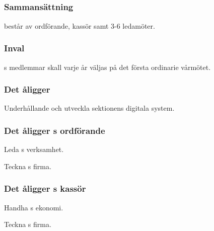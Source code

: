 \subsection{\DIGITFULL}
\subsubsection{Sammansättning}
\DIGIT{} består av ordförande, kassör samt 3-6 ledamöter.

\subsubsection{Inval}
\DIGIT{}s medlemmar skall varje år väljas på det första ordinarie vårmötet.

\subsubsection{Det åligger \DIGIT}
\begin{att}
	\item Underhållande och utveckla sektionens digitala system.
\end{att}

\subsubsection{Det åligger \DIGIT{}s ordförande}
\begin{att}
	\item Leda \DIGIT{}s verksamhet.
	\item Teckna \DIGIT{}s firma.
\end{att}

\subsubsection{Det åligger \DIGIT{}s kassör}
\begin{att}
	\item Handha \DIGIT{}s ekonomi.
	\item Teckna \DIGIT{}s firma.
\end{att}